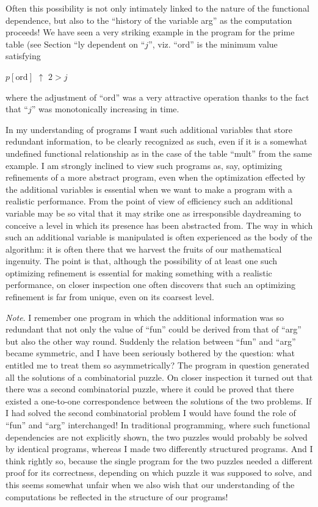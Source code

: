 Often this possibility is not only intimately linked to the nature of the functional dependence, but also to the ``history of the variable arg'' as the computation proceeds! We have seen a very striking example in the program for the prime table (see Section ``ly dependent on ``$j$'', viz. ``ord'' is the minimum value satisfying
\medskip

{
	\setlength{\parindent}{8em}
	$p[\text{ord}]$ $\uparrow$ $2 > j$
}
\medskip

\noindent
where the adjustment of ``ord'' was a very attractive operation thanks to the fact that ``$j$'' was monotonically increasing in time.

In my understanding of programs I want such additional variables that store redundant information, to be clearly recognized as such, even if it is a somewhat undefined functional relationship as in the case of the table ``mult'' from the same example. I am strongly inclined to view such programs as, say, optimizing refinements of a more abstract program, even when the optimization effected by the additional variables is essential when we want to make a program with a realistic performance. From the point of view of efficiency such an additional variable may be so vital that it may strike one as irresponsible daydreaming to conceive a level in which its presence has been abstracted from. The way in which such an additional variable is manipulated is often experienced as the body of the algorithm: it is often there that we harvest the fruits of our mathematical ingenuity. The point is that, although the possibility of at least one such optimizing refinement is essential for making something with a realistic performance, on closer inspection one often discovers that such an optimizing refinement is far from unique, even on its coarsest level.

\noindent
\textit{Note}. I remember one program in which the additional information was so redundant that not only the value of ``fun'' could be derived from that of ``arg'' but also the other way round. Suddenly the relation between ``fun'' and ``arg'' became symmetric, and I have been seriously bothered by the question: what entitled me to treat them so asymmetrically? The program in question generated all the solutions of a combinatorial puzzle. On closer inspection it turned out that there was a second combinatorial puzzle, where it could be proved that there existed a one-to-one correspondence between the solutions of the two problems. If I had solved the second combinatorial problem I would have found the role of ``fun'' and ``arg'' interchanged! In traditional programming, where such functional dependencies are not explicitly shown, the two puzzles would probably be solved by identical programs, whereas I made two differently structured programs. And I think rightly so, because the single program for the two puzzles needed a different proof for its correctness, depending on which puzzle it was supposed to solve, and this seems somewhat unfair when we also wish that our understanding of the computations be reflected in the structure of our programs!

